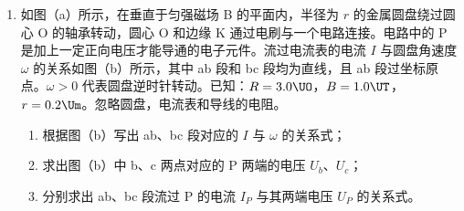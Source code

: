 \documentclass[\gkver]{gaokaozhenti}
\begin{document}
\begin{enumerate}
{得出：$v_{2}=\frac{3}{4}v_{0}$。

（2）$P_{1}$、$P_{2}$、P 第一次等速弹簧最大压缩量最大，由能量守恒得
$\mu\cdot 2mg(L+x)+E_{p}=\frac{1}{2}(2m)v_{0}^{2}+\frac{1}{2}(2m)v_{1}^{2}-\frac{1}{2}(4m)v_{2}^{2}$ ③

P 刚进入 $P_{2}$ 到 $P_{1}$、$P_{2}$、P 第二次等速时有能量守恒得：
$\mu\cdot 2mg(2L+2x)=\frac{1}{2}(2m)v_{0}^{2}+\frac{1}{2}(2m)v_{1}^{2}-\frac{1}{2}(4m)v_{2}^{2}$ ④

由③④得：$x=\frac{v_{0}^{2}}{32\mu}-L$，$E_{p}=\frac{mv_{0}^{2}}{16}$。
}

\item
如图（a）所示，在垂直于匀强磁场 B 的平面内，半径为 $r$ 的金属圆盘绕过圆心 O 的轴承转动，圆心 O 和边缘 K 通过电刷与一个电路连接。电路中的 P 是加上一定正向电压才能导通的电子元件。流过电流表的电流 $I$ 与圆盘角速度 $\omega$ 的关系如图（b）所示，其中 ab 段和 bc 段均为直线，且 ab 段过坐标原点。$\omega>0$ 代表圆盘逆时针转动。已知：$R=3.0\UO$，$B=1.0\UT$，$r=0.2\Um$。忽略圆盘，电流表和导线的电阻。
\begin{enumerate}
	\item
	根据图（b）写出 ab、bc 段对应的 $I$ 与 $\omega$ 的关系式；
	\item
	求出图（b）中 b、c 两点对应的 P 两端的电压 $U_{b}$、$U_{c}$；
	\item
	分别求出 ab、bc 段流过 P 的电流 $I_{P}$ 与其两端电压 $U_{P}$ 的关系式。
\end{enumerate}


\end{enumerate}
\end{document}
